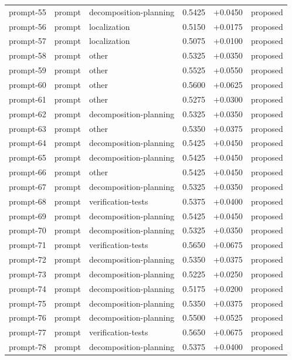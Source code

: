 \begin{center}
\begin{longtable}{llp{5.2cm}rrl}
prompt-55 & prompt & decomposition-planning & 0.5425 & +0.0450 & proposed \\
prompt-56 & prompt & localization & 0.5150 & +0.0175 & proposed \\
prompt-57 & prompt & localization & 0.5075 & +0.0100 & proposed \\
prompt-58 & prompt & other & 0.5325 & +0.0350 & proposed \\
prompt-59 & prompt & other & 0.5525 & +0.0550 & proposed \\
prompt-60 & prompt & other & 0.5600 & +0.0625 & proposed \\
prompt-61 & prompt & other & 0.5275 & +0.0300 & proposed \\
prompt-62 & prompt & decomposition-planning & 0.5325 & +0.0350 & proposed \\
prompt-63 & prompt & other & 0.5350 & +0.0375 & proposed \\
prompt-64 & prompt & decomposition-planning & 0.5425 & +0.0450 & proposed \\
prompt-65 & prompt & decomposition-planning & 0.5425 & +0.0450 & proposed \\
prompt-66 & prompt & other & 0.5425 & +0.0450 & proposed \\
prompt-67 & prompt & decomposition-planning & 0.5325 & +0.0350 & proposed \\
prompt-68 & prompt & verification-tests & 0.5375 & +0.0400 & proposed \\
prompt-69 & prompt & decomposition-planning & 0.5425 & +0.0450 & proposed \\
prompt-70 & prompt & decomposition-planning & 0.5325 & +0.0350 & proposed \\
prompt-71 & prompt & verification-tests & 0.5650 & +0.0675 & proposed \\
prompt-72 & prompt & decomposition-planning & 0.5350 & +0.0375 & proposed \\
prompt-73 & prompt & decomposition-planning & 0.5225 & +0.0250 & proposed \\
prompt-74 & prompt & decomposition-planning & 0.5175 & +0.0200 & proposed \\
prompt-75 & prompt & decomposition-planning & 0.5350 & +0.0375 & proposed \\
prompt-76 & prompt & decomposition-planning & 0.5500 & +0.0525 & proposed \\
prompt-77 & prompt & verification-tests & 0.5650 & +0.0675 & proposed \\
prompt-78 & prompt & decomposition-planning & 0.5375 & +0.0400 & proposed \\

\end{longtable}
\end{center}
